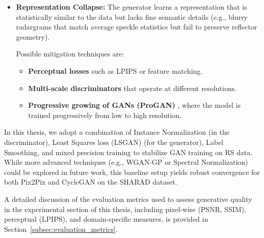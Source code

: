 \begin{itemize}
    Possible mitigation techniques are:
    \begin{itemize}
        \item \textbf{Adaptive training schedules}: update the weaker network more frequently or use heuristics to pause the stronger one.
        \item \textbf{Wasserstein GANs (WGAN)} \cite{Arjovsky2017}, which replace the Jensen–Shannon divergence with the Wasserstein distance and enforce $1$-Lipschitz continuity via gradient penalty.
        \item \textbf{Two-timescale update rule (TTUR)} \cite{Heusel2017}, where the generator and discriminator have different learning rates and optimizers.
    \end{itemize}

    \item \textbf{Representation Collapse:} The generator learns a representation that is statistically similar to the data but lacks fine semantic details (e.g., blurry radargrams that match average speckle statistics but fail to preserve reflector geometry).

    Possible mitigation techniques are:
    \begin{itemize}
        \item \textbf{Perceptual losses} such as LPIPS or feature matching.
        \item \textbf{Multi-scale discriminators} that operate at different resolutions.
        \item \textbf{Progressive growing of GANs (ProGAN)} \cite{Karras2018}, where the model is trained progressively from low to high resolution.
    \end{itemize}
\end{itemize}

In this thesis, we adopt a combination of Instance Normalization (in the discriminator), Least Squares loss (LSGAN) (for the generator), Label Smoothing, and mixed precision training to stabilize GAN training on RS data.
While more advanced techniques (e.g., WGAN-GP or Spectral Normalization) could be explored in future work, this baseline setup yields robust convergence for both Pix2Pix and CycleGAN on the SHARAD dataset.

A detailed discussion of the evaluation metrics used to assess generative quality in the experimental section of this thesis, including pixel-wise (PSNR, SSIM), perceptual (LPIPS), and domain-specific measures, is provided in Section~\ref{subsec:evaluation_metrics}.


